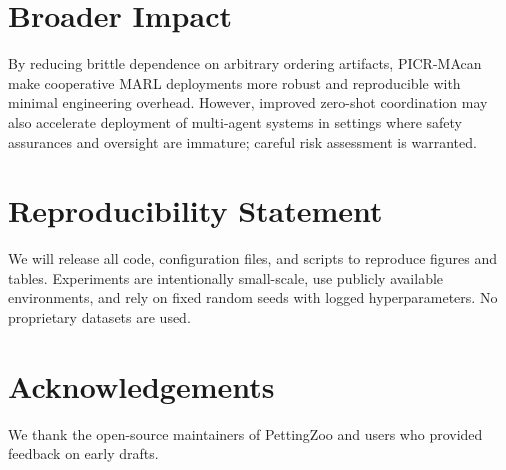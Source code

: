 \documentclass[nohyperref]{article}
\newcommand{\method}{PICR-MA} %
\begin{document}
\section{Broader Impact}
By reducing brittle dependence on arbitrary ordering artifacts, \method can make cooperative MARL deployments more robust and reproducible with minimal engineering overhead. However, improved zero-shot coordination may also accelerate deployment of multi-agent systems in settings where safety assurances and oversight are immature; careful risk assessment is warranted.

\section{Reproducibility Statement}
We will release all code, configuration files, and scripts to reproduce figures and tables. Experiments are intentionally small-scale, use publicly available environments, and rely on fixed random seeds with logged hyperparameters. No proprietary datasets are used.

\section*{Acknowledgements}
We thank the open-source maintainers of PettingZoo and users who provided feedback on early drafts.
\end{document}
